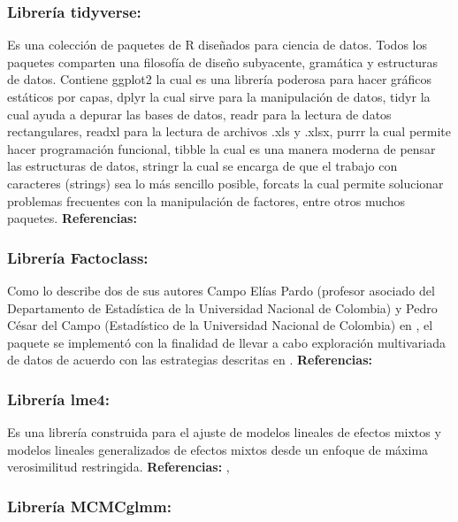 \documentclass[]{article}
\theoremstyle{definition}
\theoremstyle{definition}
\theoremstyle{definition}
\theoremstyle{remark}
\begin{document}
\subsubsection{Librería tidyverse:}\label{libreria-tidyverse}

Es una colección de paquetes de R diseñados para ciencia de datos. Todos
los paquetes comparten una filosofía de diseño subyacente, gramática y
estructuras de datos. Contiene ggplot2 la cual es una librería poderosa
para hacer gráficos estáticos por capas, dplyr la cual sirve para la
manipulación de datos, tidyr la cual ayuda a depurar las bases de datos,
readr para la lectura de datos rectangulares, readxl para la lectura de
archivos .xls y .xlsx, purrr la cual permite hacer programación
funcional, tibble la cual es una manera moderna de pensar las
estructuras de datos, stringr la cual se encarga de que el trabajo con
caracteres (strings) sea lo más sencillo posible, forcats la cual
permite solucionar problemas frecuentes con la manipulación de factores,
entre otros muchos paquetes. \textbf{Referencias:} \citep{tidyverse}

\subsubsection{Librería Factoclass:}\label{libreria-factoclass}

Como lo describe dos de sus autores Campo Elías Pardo (profesor asociado
del Departamento de Estadística de la Universidad Nacional de Colombia)
y Pedro César del Campo (Estadístico de la Universidad Nacional de
Colombia) en \citep{Pardo2007}, el paquete se implementó con la
finalidad de llevar a cabo exploración multivariada de datos de acuerdo
con las estrategias descritas en \citep{Lebart} . \textbf{Referencias:}
\citep{Factoclass}

\subsubsection{Librería lme4:}\label{libreria-lme4}

Es una librería construida para el ajuste de modelos lineales de efectos
mixtos y modelos lineales generalizados de efectos mixtos desde un
enfoque de máxima verosimilitud restringida. \textbf{Referencias:}
\citep{lme4}, \citep{Bates}

\subsubsection{Librería MCMCglmm:}\label{libreria-mcmcglmm}
\end{document}

